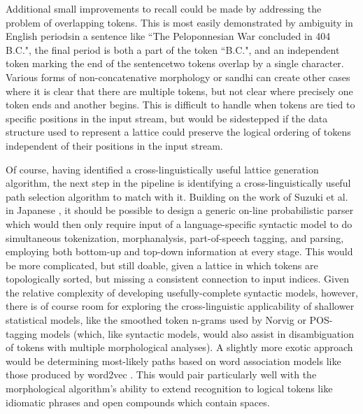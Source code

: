 Additional small improvements to recall could be made by addressing the problem of overlapping tokens. This is most easily demonstrated by ambiguity in English periods\textemdash in a sentence like ``The Peloponnesian War concluded in 404 B.C.", the final period is both a part of the token ``B.C.", and an independent token marking the end of the sentence\textemdash two tokens overlap by a single character. Various forms of non-concatenative morphology or sandhi can create other cases where it is clear that there are multiple tokens, but not clear where precisely one token ends and another begins. This is difficult to handle when tokens are tied to specific positions in the input stream, but would be sidestepped if the data structure used to represent a lattice could preserve the logical ordering of tokens independent of their positions in the input stream.

Of course, having identified a cross-linguistically useful lattice generation algorithm, the next step in the pipeline is identifying a cross-linguistically useful path selection algorithm to match with it. Building on the work of Suzuki et al. in Japanese \cite{suzuki00}, it should be possible to design a generic on-line probabilistic parser which would then only require input of a language-specific syntactic model to do simultaneous tokenization, morphanalysis, part-of-speech tagging, and parsing, employing both bottom-up and top-down information at every stage. This would be more complicated, but still doable, given a lattice in which tokens are topologically sorted, but missing a consistent connection to input indices. Given the relative complexity of developing usefully-complete syntactic models, however, there is of course room for exploring the cross-linguistic applicability of shallower statistical models, like the smoothed token n-grams used by Norvig \cite{norvig14} or POS-tagging models (which, like syntactic models, would also assist in disambiguation of tokens with multiple morphological analyses). A slightly more exotic approach would be determining most-likely paths based on word association models like those produced by word2vec \cite{mikolov13}. This would pair particularly well with the morphological algorithm's ability to extend recognition to logical tokens like idiomatic phrases and open compounds which contain spaces.